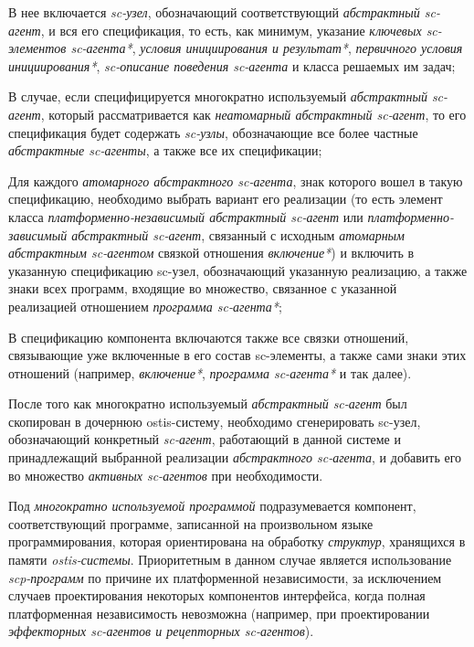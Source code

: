 \begin{textitemize}
    \item В нее включается \textit{sc-узел}, обозначающий соответствующий \textit{абстрактный sc-агент}, и вся его спецификация, то есть, как минимум, указание \textit{ключевых sc-элементов sc-агента*}, \textit{условия инициирования и результат*}, \textit{первичного условия инициирования*}, \textit{sc-описание поведения sc-агента} и класса решаемых им задач;
    \item В случае, если специфицируется многократно используемый \textit{абстрактный sc-агент}, который рассматривается как \textit{неатомарный абстрактный sc-агент}, то его спецификация  будет содержать \textit{sc-узлы}, обозначающие все более частные \textit{абстрактные sc-агенты}, а также все их спецификации;
    \item Для каждого \textit{атомарного абстрактного sc-агента}, знак которого вошел в такую спецификацию, необходимо выбрать вариант его реализации (то есть элемент класса \textit{платформенно-независимый абстрактный sc-агент} или \textit{платформенно-зависимый абстрактный sc-агент}, связанный с исходным \textit{атомарным абстрактным sc-агентом} связкой отношения \textit{включение*}) и включить в указанную спецификацию sc-узел, обозначающий указанную реализацию, а также знаки всех программ, входящие во множество, связанное с указанной реализацией отношением \textit{программа sc-агента*};
    \item В спецификацию компонента включаются также все связки отношений, связывающие уже включенные в его состав sc-элементы, а также сами знаки этих отношений (например, \textit{включение*}, \textit{программа sc-агента*} и так далее).
\end{textitemize}

После того как многократно используемый \textit{абстрактный sc-агент} был скопирован в дочернюю ostis-систему, необходимо сгенерировать sc-узел, обозначающий конкретный \textit{sc-агент}, работающий в данной системе и принадлежащий выбранной реализации \textit{абстрактного sc-агента}, и добавить его во множество \textit{активных sc-агентов} при необходимости.

Под \textit{многократно используемой программой} подразумевается компонент, соответствующий программе, записанной на произвольном языке программирования, которая ориентирована на обработку \textit{структур}, хранящихся в памяти \textit{ostis-системы}. Приоритетным в данном случае является использование \textit{scp-программ} по причине их платформенной независимости, за исключением случаев проектирования некоторых компонентов интерфейса, когда полная платформенная независимость невозможна (например, при проектировании \textit{эффекторных sc-агентов и рецепторных sc-агентов}).

